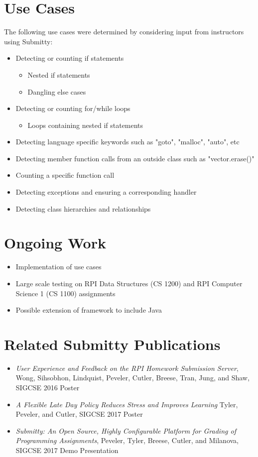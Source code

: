 \documentclass[thesis]{hmcposter}
\begin{document}
\begin{poster}
\section{Use Cases}
The following use cases were determined by considering input from instructors using Submitty:
\begin{itemize}
\item{Detecting or counting if statements}
	\begin{itemize}
		\item {Nested if statements}
		\item {Dangling else cases}
	\end{itemize}
\item{Detecting or counting for/while loops}
	\begin{itemize}
		\item {Loops containing nested if statements}
	\end{itemize}
\item{Detecting language specific keywords such as "goto", "malloc", "auto", etc}	
\item{Detecting member function calls from an outside class such as "vector.erase()"}
\item{Counting a specific function call}
\item{Detecting exceptions and ensuring a corresponding handler}
\item{Detecting class hierarchies and relationships}
\end{itemize}

\section{Ongoing Work}
\begin{itemize}
\item{Implementation of use cases}
\item{Large scale testing on RPI Data Structures (CS 1200) and RPI Computer Science 1 (CS 1100) assignments}
\item{Possible extension of framework to include Java}
\end{itemize}


\section{Related Submitty Publications}
\begin{itemize}
\item \textit{User Experience and Feedback on the RPI Homework Submission Server}, Wong, Sihsobhon, Lindquist, Peveler, Cutler, Breese, Tran, Jung, and Shaw, SIGCSE 2016 Poster 
\item \textit{A Flexible Late Day Policy Reduces Stress and Improves Learning} Tyler, Peveler, and Cutler,
SIGCSE 2017 Poster
\item \textit{Submitty: An Open Source, Highly Configurable Platform for Grading of Programming Assignments}, Peveler, Tyler, Breese, Cutler, and Milanova, SIGCSE 2017 Demo Presentation
\end{itemize}


\end{poster}
\end{document}
